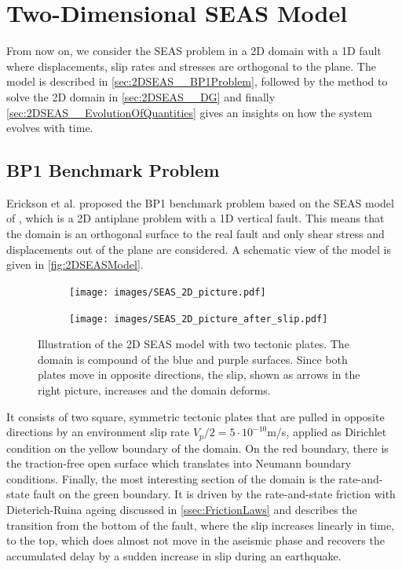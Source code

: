 \chapter{Two-Dimensional SEAS Model}
\label{chap:2DSEAS}
From now on, we consider the SEAS problem in a 2D domain with a 1D fault where displacements, slip rates and stresses are orthogonal to the plane. The model is described in \autoref{sec:2DSEAS__BP1Problem}, followed by the method to solve the 2D domain in \autoref{sec:2DSEAS__DG} and finally \autoref{sec:2DSEAS__EvolutionOfQuantities} gives an insights on how the system evolves with time.

\section{BP1 Benchmark Problem}
\label{sec:2DSEAS__BP1Problem}
Erickson et al. \cite{BP1-Benchmark} proposed the BP1 benchmark problem based on the SEAS model of \cite{GeneralSEASSimulations}, which is a 2D antiplane problem with a 1D vertical fault. This means that the domain is an orthogonal surface to the real fault and only shear stress and displacements out of the plane are considered. A schematic view of the model is given in \autoref{fig:2DSEASModel}. \\ 

\begin{figure}[H]
	\centering
	\begin{subfigure}[t]{0.49\textwidth}
		\centering
		\texttt{[image: images/SEAS\_2D\_picture.pdf]}
	\end{subfigure}
	\begin{subfigure}[t]{0.49\textwidth}
		\centering
		\texttt{[image: images/SEAS\_2D\_picture\_after\_slip.pdf]}
	\end{subfigure}
	\caption{Illustration of the 2D SEAS model with two tectonic plates. The domain is compound of the blue and purple surfaces. Since both plates move in opposite directions, the slip, shown as arrows in the right picture, increases and the domain deforms.}
	\label{fig:2DSEASModel}
\end{figure}
It consists of two square, symmetric tectonic plates that are pulled in opposite directions by an environment slip rate $V_p/2=5\cdot10^{-10}$m/s, applied as Dirichlet condition on the yellow boundary of the domain. On the red boundary, there is the traction-free open surface which translates into Neumann boundary conditions. Finally, the most interesting section of the domain is the rate-and-state fault on the green boundary. It is driven by the rate-and-state friction with Dieterich-Ruina ageing discussed in \autoref{ssec:FrictionLaws} and describes the transition from the bottom of the fault, where the slip increases linearly in time, to the top, which does almost not move in the aseismic phase and recovers the accumulated delay by a sudden increase in slip during an earthquake. \\

